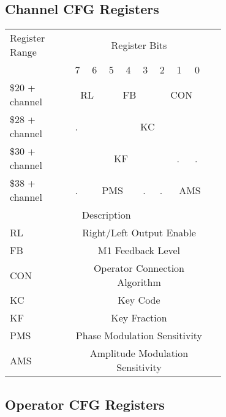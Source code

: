 \subsection{Channel CFG Registers}

\begin{tabular}{|m{0.25\linewidth}|p{0.05\linewidth}|p{0.05\linewidth}|p{0.05\linewidth}|p{0.05\linewidth}|p{0.05\linewidth}|p{0.05\linewidth}|p{0.05\linewidth}|p{0.05\linewidth}|p{0.05\linewidth}|}
	\hline

	\multirowcell{2}{Register\\Range}&\multicolumn{8}{c|}{Register Bits} \\\cline{2-9}
	& 7 & 6 & 5 & 4 & 3 & 2 & 1 & 0 \\ \hline

	\$20 + channel & \multicolumn{2}{c|}{RL} & \multicolumn{3}{c|}{FB} & \multicolumn{3}{c|}{CON} \\\cline{1-9}

	\$28 + channel & . & \multicolumn{7}{c|}{KC} \\\cline{1-9}
	\$30 + channel & \multicolumn{6}{c|}{KF} & . & . \\\cline{1-9}
	\$38 + channel & . & \multicolumn{3}{c|}{PMS} & . & . & \multicolumn{2}{c|}{AMS} \\\cline{1-9}

	\multicolumn{9}{|c|}{Description} \\ \hline
	
	RL & \multicolumn{8}{c|}{Right/Left Output Enable}\\\hline
	FB &  \multicolumn{8}{c|}{M1 Feedback Level}\\\hline
	CON &  \multicolumn{8}{c|}{Operator Connection Algorithm}\\\hline
	KC & \multicolumn{8}{c|}{Key Code}\\\hline
	KF & \multicolumn{8}{c|}{Key Fraction}\\\hline
	PMS & \multicolumn{8}{c|}{Phase Modulation Sensitivity}\\\hline
	AMS & \multicolumn{8}{c|}{Amplitude Modulation Sensitivity}\\\hline

\end{tabular}

\clearpage

\subsection{Operator CFG Registers}

